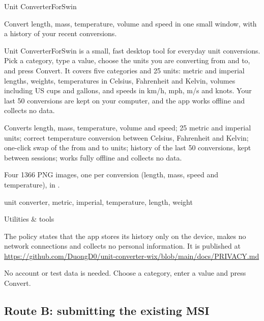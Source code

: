 \documentclass[11pt,a4paper]{article}
\newcommand{\file}{\path}
\begin{document}
\begin{description}[leftmargin=3.2cm, style=nextline]
  \item[Product name] Unit ConverterForSwin
  \item[Short description] Convert length, mass, temperature, volume and speed in one small
        window, with a history of your recent conversions.
  \item[Description] Unit ConverterForSwin is a small, fast desktop tool for everyday unit
        conversions. Pick a category, type a value, choose the units you are converting from and
        to, and press Convert. It covers five categories and 25 units: metric and imperial
        lengths, weights, temperatures in Celsius, Fahrenheit and Kelvin, volumes including US
        cups and gallons, and speeds in km/h, mph, m/s and knots. Your last 50 conversions are
        kept on your computer, and the app works offline and collects no data.
  \item[Features] Converts length, mass, temperature, volume and speed; 25 metric and imperial
        units; correct temperature conversion between Celsius, Fahrenheit and Kelvin; one-click
        swap of the from and to units; history of the last 50 conversions, kept between
        sessions; works fully offline and collects no data.
  \item[Screenshots] Four 1366 PNG images, one per conversion (length, mass, speed
        and temperature), in \file{docs/store-screenshots}.
  \item[Keywords] unit converter, metric, imperial, temperature, length, weight
  \item[Category] Utilities \& tools
  \item[Privacy policy] The policy states that the app stores its history only on the device,
        makes no network connections and collects no personal information. It is published at\\
        {\small\url{https://github.com/DuongD0/unit-converter-wix/blob/main/docs/PRIVACY.md}}
  \item[Notes for testers] No account or test data is needed. Choose a category, enter a value
        and press Convert.
\end{description}

\subsection{Route B: submitting the existing MSI}
\end{document}
